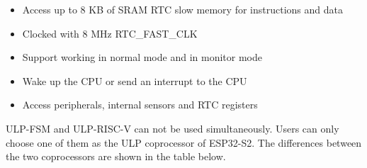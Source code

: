 \documentclass[main\_\_EN.tex]{subfiles}
\begin{document}
\begin{itemize}
    \item Access up to 8 KB of SRAM RTC slow memory for instructions and data
    \item Clocked with 8 MHz RTC\_FAST\_CLK
    \item Support working in normal mode and in monitor mode
    \item Wake up the CPU or send an interrupt to the CPU
    \item Access peripherals, internal sensors and RTC registers
\end{itemize}

ULP-FSM and ULP-RISC-V can not be used simultaneously. Users can only choose one of them as the ULP coprocessor of ESP32-S2. The differences between the two coprocessors are shown in the table below.
\end{document}
